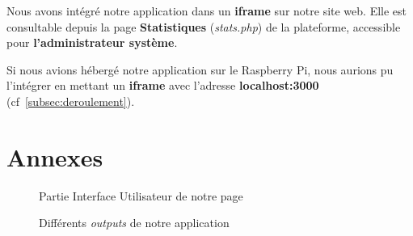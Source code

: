 \documentclass[12pt, a4paper]{article}
\begin{document}
\noindent Nous avons intégré notre application dans un \textbf{iframe} sur notre site web.
Elle est consultable depuis la page \textbf{Statistiques} (\textit{stats.php}) de la plateforme,
accessible pour \textbf{l'administrateur système}.

\bigskip
Si nous avions hébergé notre application sur le Raspberry Pi,
nous aurions pu l'intégrer en mettant un \textbf{iframe} avec l'adresse \textbf{localhost\string:3000} (cf~\ref{subsec:deroulement}).

\newpage

\section{Annexes}
\bigskip
\begin{figure}[ht]
    \centering
    \caption{Partie Interface Utilisateur de notre page}\label{fig:shiny_ui}
\end{figure}
\begin{figure}[ht]
    \centering
    \caption{Différents \textit{outputs} de notre application}\label{fig:shiny_server}
\end{figure}
\end{document}
